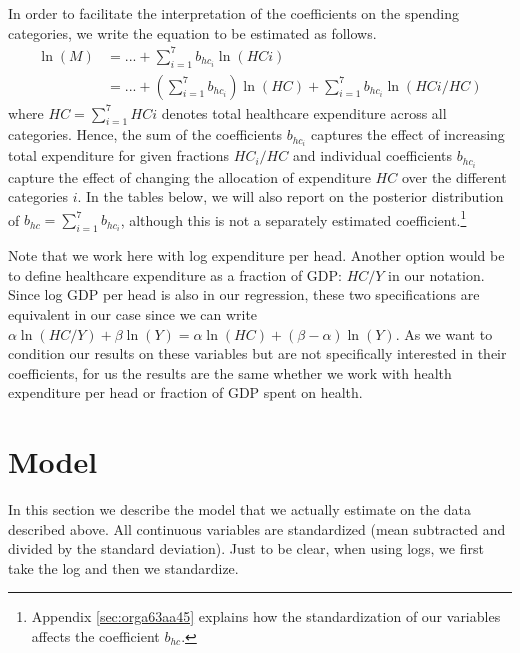 \documentclass[a4paper,12pt]{article}
\begin{document}
In order to facilitate the interpretation of the coefficients on the spending categories, we write the equation to be estimated as follows.
\begin{align}
\label{eq:17}
\ln(M) &= ... + \sum_{i=1}^7 b_{hc_i} \ln(HCi) \\
\label{eq:18}
 &= ... + \left(\sum_{i=1}^7 b_{hc_i} \right) \ln(HC) +  \sum_{i=1}^7 b_{hc_i} \ln(HCi/HC) 
\end{align}
where \(HC =  \sum_{i=1}^7 HCi\) denotes total healthcare expenditure across all categories. Hence, the sum of the coefficients \(b_{hc_i}\) captures the effect of increasing total expenditure for given fractions \(HC_i/HC\) and individual coefficients \(b_{hc_i}\) capture the effect of changing the allocation of expenditure \(HC\) over the different categories \(i\). In the tables below, we will also report on the posterior distribution of \(b_{hc}= \sum_{i=1}^7 b_{hc_i}\), although this is not a separately estimated coefficient.\footnote{Appendix \ref{sec:orga63aa45} explains how the standardization of our variables affects the coefficient \(b_{hc}\).}

Note that we work here with log expenditure per head. Another option would be to define healthcare expenditure as a fraction of GDP: \(HC/Y\) in our notation. Since log GDP per head is also in our regression, these two specifications are equivalent in our case since we can write \(\alpha \ln(HC/Y) + \beta \ln(Y) = \alpha \ln(HC) + (\beta-\alpha) \ln(Y)\). As we want to condition our results on these variables but are not specifically interested in their coefficients, for us the results are the same whether we work with health expenditure per head or fraction of GDP spent on health.




\section{Model}
\label{sec:org7db357a}

In this section we describe the model that we actually estimate on the data described above.  All continuous variables are standardized (mean subtracted and divided by the standard deviation). Just to be clear, when using logs, we first take the log and then we standardize.
\end{document}
